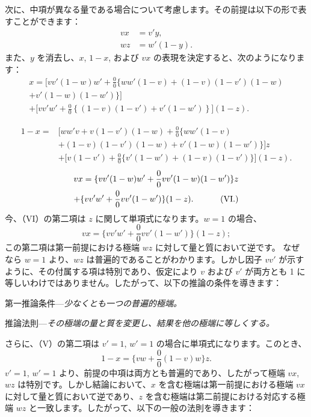 \documentclass[a4paper,11pt,openany]{ltjsbook}
\begin{document}
次に、中項が異なる量である場合について考慮します。その前提は以下の形で表すことができます：
\begin{align*}
 vx &= v'y, \tag{4} \\
 wz &= w'(1-y). \tag{5}
\end{align*}
また、$y$ を消去し、$x$, $1-x$, および $vx$ の表現を決定すると、次のようになります：
\begin{multline*}
 x = \bigl[ vv'(1-w)w' + \frac{0}{0} \bigl\{ ww'(1-v) + (1-v)(1-v')(1-w) \\
  + v'(1-w)(1-w') \bigr\} \bigr] \\
+ \bigl[ vv'w' + \frac{0}{0} \left\{ (1-v)(1-v') + v'(1-w') \right\} \bigr](1-z). \tag{IV}
\end{multline*}

\begin{align*}
1 - x = & \bigl[ww'v + v(1-v')(1-w) + \frac{0}{0} \{ww'(1-v) \\
& + (1-v)(1-v')(1-w) + v'(1-w)(1-w')\}\bigr]z \\
& + \bigl[v(1-v') + \frac{0}{0} \{v'(1-w') + (1-v)(1-v')\}\bigr](1-z).
\tag{V.}
\end{align*}
\begin{multline*}
vx = \{vv'(1-w)w' + \frac{0}{0} vv'(1-w)(1-w')\}z \\
+ \{vv'w' + \frac{0}{0} vv'(1-w')\}(1-z). \hfill \tag{VI.}
\end{multline*}
今、（VI）の第二項は $z$ に関して単項式になります。$w = 1$ の場合、
\[
vx = \{vv'w' + \frac{0}{0} vv'(1-w')\}(1-z);
\]
この第二項は第一前提における極端 $wz$ に対して量と質において逆です。
なぜなら $w = 1$ より、$wz$ は普遍的であることがわかります。しかし因子 $vv'$ が示すように、その付属する項は特別であり、仮定により $v$ および $v'$ が両方とも 1 に等しいわけではありません。したがって、以下の推論の条件を導きます：

\textsc{第一推論条件}---\emph{少なくとも一つの普遍的極端。}

\textsc{推論法則}---\emph{その極端の量と質を変更し、結果を他の極端に等しくする。}

さらに、（V）の第二項は $v' = 1$, $w' = 1$ の場合に単項式になります。このとき、
\[
1 - x = \{vw + \frac{0}{0}(1-v)w\}z.
\]
$v' = 1$, $w' = 1$ より、前提の中項は両方とも普遍的であり、したがって極端 $vx$, $wz$ は特別です。しかし結論において、$x$ を含む極端は第一前提における極端 $vx$ に対して量と質において逆であり、$z$ を含む極端は第二前提における対応する極端 $wz$ と一致します。したがって、以下の一般の法則を導きます：
\end{document}
